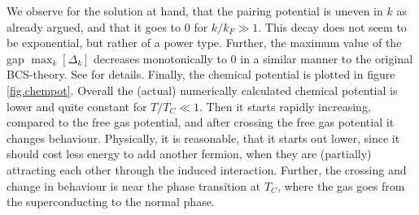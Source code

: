  We observe for the solution at hand, that the pairing potential is uneven in $k$ as already argued, and that it goes to 0 for $k/k_F \gg 1$. This decay does not seem to be exponential, but rather of a power type. Further, the maximum value of the gap $\max_k[\Delta_k]$ decreases monotonically to 0 in a similar manner to the original BCS-theory. See \cite{Tinkham,BruusFlensberg,PlischkeStatPhys} for details. Finally, the chemical potential is plotted in figure \ref{fig.chempot}. Overall the (actual) numerically calculated chemical potential is lower and quite constant for $T/T_C \ll 1$. Then it starts rapidly increasing, compared to the free gas potential, and after crossing the free gas potential it changes behaviour. Physically, it is reasonable, that it starts out lower, since it should cost less energy to add another fermion, when they are (partially) attracting each other through the induced interaction. Further, the crossing and change in behaviour is near the phase transition at $T_C$, where the gas goes from the superconducting to the normal phase. 